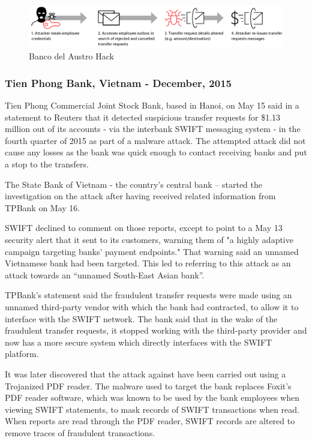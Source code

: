 \documentclass[12pt]{article}
\begin{document}
        \begin{figure}[H]
        \centering
        \includegraphics[width=\textwidth]{figures/austro.png}
        \caption{Banco del Austro Hack}
        \label{fig:AustroHacks}
        \end{figure}
        
    \subsubsection{Tien Phong Bank, Vietnam - December, 2015}
        Tien Phong Commercial Joint Stock Bank, based in Hanoi, on May 15 said in a statement to Reuters that it detected suspicious transfer requests for \$1.13 million out of its accounts - via the interbank SWIFT messaging system - in the fourth quarter of 2015 as part of a malware attack. The attempted attack did not cause any losses as the bank was quick enough to contact receiving banks and put a stop to the transfers.
        
        The State Bank of Vietnam - the country's central bank – started the investigation on the attack after having received related information from TPBank on May 16.
        
        SWIFT declined to comment on those reports, except to point to a May 13 security alert that it sent to its customers, warning them of "a highly adaptive campaign targeting banks' payment endpoints." That warning said an unnamed Vietnamese bank had been targeted. This led to referring to this attack as an attack towards an “unnamed South-East Asian bank”.\cite{SWIFTWarnsBanks}
        
        TPBank's statement said the fraudulent transfer requests were made using an unnamed third-party vendor with which the bank had contracted, to allow it to interface with the SWIFT network. The bank said that in the wake of the fraudulent transfer requests, it stopped working with the third-party provider and now has a more secure system which directly interfaces with the SWIFT platform.
        
        It was later discovered that the attack against have been carried out using a Trojanized PDF reader. The malware used to target the bank replaces Foxit's PDF reader software, which was known to be used by the bank employees when viewing SWIFT statements, to mask records of SWIFT transactions when read. When reports are read through the PDF reader, SWIFT records are altered to remove traces of fraudulent transactions.
        
\end{document}
